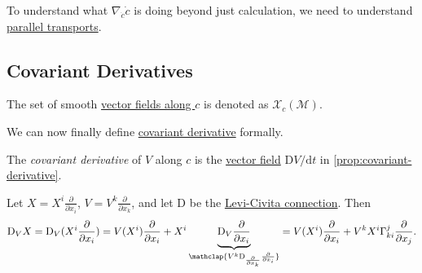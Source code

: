 To understand what \(\nabla _{\dot{c} } \dot{c} \) is doing beyond just calculation, we need to understand \hyperref[def:parallel-transport]{parallel transports}.

\subsection{Covariant Derivatives}


\begin{prev}
	The set of smooth \hyperref[def:vector-field-along-curve]{vector fields along \(c\)} is denoted as \(\mathcal{X} _c(\mathcal{M} )\).
\end{prev}

We can now finally define \hyperref[def:covariant-derivative]{covariant derivative} formally.

\begin{definition}\label{def:covariant-derivative}
	The \emph{covariant derivative} of \(V\) along \(c\) is the \hyperref[def:vector-field-along-curve]{vector field} \(\mathrm{D} V / \mathrm{d} t\) in \autoref{prop:covariant-derivative}.
\end{definition}

\begin{prev}
	Let \(X = X^i \frac{\partial }{\partial x_i}\), \(V = V^k \frac{\partial}{\partial x_k}\), and let \(\mathrm{D} \) be the \hyperref[def:Levi-Civita-connection]{Levi-Civita connection}. Then
	\[
		\mathrm{D}_V X
		= \mathrm{D} _V(X^i \frac{\partial}{\partial x_i})
		= V(X^i) \frac{\partial}{\partial x_i} + X^i \underbrace{\mathrm{D} _V \frac{\partial}{\partial x_i}}_{\mathclap{V^k \mathrm{D}_{\frac{\partial}{\partial x_k}} \frac{\partial}{\partial x_i}}}
		= V(X^i)\frac{\partial}{\partial x_i} + V^k X^i \Gamma ^j_{ki} \frac{\partial }{\partial x_j} .
	\]
\end{prev}

